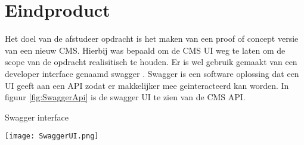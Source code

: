 \section{Eindproduct}
Het doel van de afstudeer opdracht is het maken van een proof of concept versie van een nieuw CMS.
Hierbij was bepaald om de CMS UI weg te laten om de scope van de opdracht realisitisch te houden.
Er is wel gebruik gemaakt van een developer interface genaamd swagger \parencite{Swagger}.
Swagger is een software oplossing dat een UI geeft aan een API zodat er makkelijker mee geinteracteerd kan worden.
In figuur \ref{fig:SwaggerApi} is de swagger UI te zien van de CMS API.

\whitespace
\begin{graphic}
    \captionsetup{type=figure}
    \caption{Swagger interface}
    \texttt{[image: SwaggerUI.png]}
    \label{fig:SwaggerApi}
\end{graphic}




